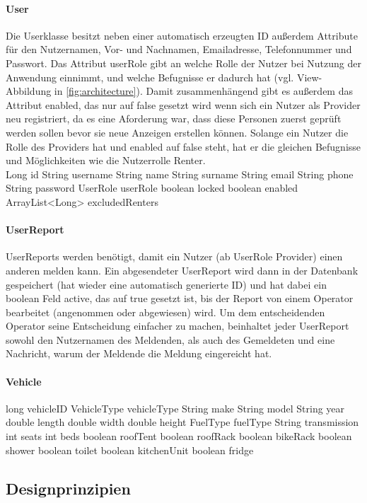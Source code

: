 \paragraph{User}
Die Userklasse besitzt neben einer automatisch erzeugten ID außerdem Attribute für den Nutzernamen, Vor- und Nachnamen, Emailadresse, Telefonnummer und Passwort. Das Attribut userRole gibt an welche Rolle der Nutzer bei Nutzung der Anwendung einnimmt, und welche Befugnisse er dadurch hat (vgl. View-Abbildung in \ref{fig:architecture}). Damit zusammenhängend gibt es außerdem das Attribut enabled, das nur auf false gesetzt wird wenn sich ein Nutzer als Provider neu registriert, da es eine Aforderung war, dass diese Personen zuerst geprüft werden sollen bevor sie neue Anzeigen erstellen können. Solange ein Nutzer die Rolle des Providers hat und enabled auf false steht, hat er die gleichen Befugnisse und Möglichkeiten wie die Nutzerrolle Renter. \\


Long id
String username
String name
String surname
String email
String phone
String password
UserRole userRole
boolean locked
boolean enabled
ArrayList<Long> excludedRenters

\paragraph{UserReport}
UserReports werden benötigt, damit ein Nutzer (ab UserRole Provider) einen anderen melden kann. Ein abgesendeter UserReport wird dann in der Datenbank gespeichert (hat wieder eine automatisch generierte ID) und hat dabei ein boolean Feld active, das auf true gesetzt ist, bis der Report von einem Operator bearbeitet (angenommen oder abgewiesen) wird. Um dem entscheidenden Operator seine Entscheidung einfacher zu machen, beinhaltet jeder UserReport sowohl den Nutzernamen des Meldenden, als auch des Gemeldeten und eine Nachricht, warum der Meldende die Meldung eingereicht hat.

\paragraph{Vehicle}
long vehicleID
VehicleType vehicleType
String make
String model
String year
double length
double width
double height
FuelType fuelType
String transmission
int seats
int beds
boolean roofTent
boolean roofRack
boolean bikeRack
boolean shower
boolean toilet
boolean kitchenUnit
boolean fridge


\subsection{Designprinzipien}

